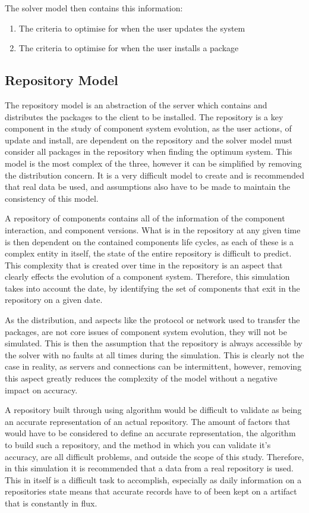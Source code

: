 The solver model then contains this information:
\begin{enumerate}
  \item The criteria to optimise for when the user updates the system
  \item The criteria to optimise for when the user installs a package
\end{enumerate}

\subsection{Repository Model}
The repository model is an abstraction of the server which contains and distributes the packages to the client to be installed.
The repository is a key component in the study of component system evolution, 
as the user actions, of update and install, are dependent on the repository and the solver model must consider all packages in the repository when finding the optimum system.
This model is the most complex of the three, however it can be simplified by removing the distribution concern.
It is a very difficult model to create and is recommended that real data be used,
and assumptions also have to be made to maintain the consistency of this model.

A repository of components contains all of the information of the component interaction, and component versions.
What is in the repository at any given time is then dependent on the contained components life cycles,
as each of these is a complex entity in itself, the state of the entire repository is difficult to predict.
This complexity that is created over time in the repository is an aspect that clearly effects the evolution of a component system.
Therefore, this simulation takes into account the date, by identifying the set of components that exit in the repository on a given date.

As the distribution, and aspects like the protocol or network used to transfer the packages, are not core issues of component system evolution,
they will not be simulated.
This is then the assumption that the repository is always accessible by the solver with no faults at all times during the simulation.
This is clearly not the case in reality, as servers and connections can be intermittent,
however, removing this aspect greatly reduces the complexity of the model without a negative impact on accuracy. 

A repository built through using algorithm would be difficult to validate as being an accurate representation of an actual repository.
The amount of factors that would have to be considered to define an accurate representation, the algorithm to build such a repository,
and the method in which you can validate it's accuracy,
are all difficult problems, and outside the scope of this study. 
Therefore, in this simulation it is recommended that a data from a real repository is used.
This in itself is a difficult task to accomplish, especially as daily information on a repositories state means that accurate records have to of been kept on a artifact that is constantly in flux.


